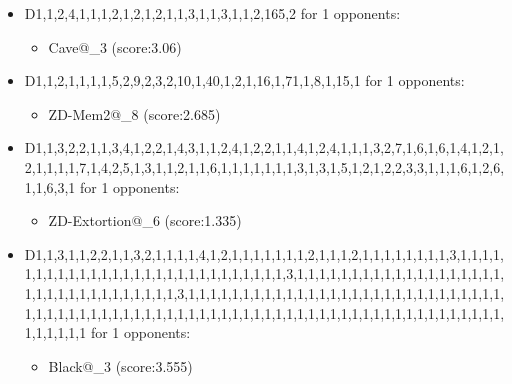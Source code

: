 \begin{appendices}
\begin{itemize}
        \item D1,1,2,4,1,1,1,2,1,2,1,2,1,1,3,1,1,3,1,1,2,165,2 for 1 opponents:
        \begin{multicols}{3}
            \begin{itemize}
                \item Cave@\_3 (score:3.06)
            \end{itemize}
        \end{multicols}

        \item D1,1,2,1,1,1,1,5,2,9,2,3,2,10,1,40,1,2,1,16,1,71,1,8,1,15,1 for 1 opponents:
        \begin{multicols}{3}
            \begin{itemize}
                \item ZD-Mem2@\_8 (score:2.685)
            \end{itemize}
        \end{multicols}

        \item D1,1,3,2,2,1,1,3,4,1,2,2,1,4,3,1,1,2,4,1,2,2,1,1,4,1,2,4,1,1,1,3,2,7,1,6,1,6,1,4,1,2,1,2,1,1,1,1,7,1,4,2,5,1,3,1,1,2,1,1,6,1,1,1,1,1,1,1,3,1,3,1,5,1,2,1,2,2,3,3,1,1,1,6,1,2,6,1,1,6,3,1 for 1 opponents:
        \begin{multicols}{3}
            \begin{itemize}
                \item ZD-Extortion@\_6 (score:1.335)
            \end{itemize}
        \end{multicols}

        \item D1,1,3,1,1,2,2,1,1,3,2,1,1,1,1,4,1,2,1,1,1,1,1,1,1,2,1,1,1,2,1,1,1,1,1,1,1,1,3,1,1,1,1,1,1,1,1,1,1,1,1,1,1,1,1,1,1,1,1,1,1,1,1,1,1,1,1,3,1,1,1,1,1,1,1,1,1,1,1,1,1,1,1,1,1,1,1,1,1,1,1,1,1,1,1,1,1,1,1,1,1,3,1,1,1,1,1,1,1,1,1,1,1,1,1,1,1,1,1,1,1,1,1,1,1,1,1,1,1,1,1,1,1,1,1,1,1,1,1,1,1,1,1,1,1,1,1,1,1,1,1,1,1,1,1,1,1,1,1,1,1,1,1,1,1,1,1,1,1,1,1,1,1,1,1,1,1,1,1,1,1 for 1 opponents:
        \begin{multicols}{3}
            \begin{itemize}
                \item Black@\_3 (score:3.555)
            \end{itemize}
        \end{multicols}


\end{itemize}
\end{appendices}
